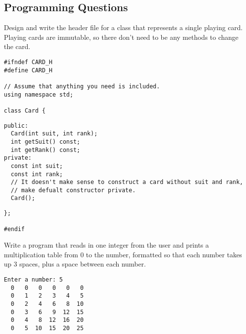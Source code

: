\documentclass[11pt,answers]{exam}
\begin{document}
\begin{questions}

\newpage
\section*{Programming Questions}

\question[20] Design and write the header file for a class that represents a single playing card. Playing cards are immutable, so there don't need to be any methods to change the card.
\begin{verbatim}
#ifndef CARD_H
#define CARD_H

// Assume that anything you need is included.
using namespace std;

class Card {
\end{verbatim}

\begin{solution}[4.5in]
\begin{verbatim}
public:
  Card(int suit, int rank);
  int getSuit() const;
  int getRank() const;
private:
  const int suit;
  const int rank;
  // It doesn't make sense to construct a card without suit and rank,
  // make defualt constructor private.
  Card();
\end{verbatim}
\end{solution}

\begin{verbatim}
};

#endif
\end{verbatim}

\newpage

\question[20] Write a program that reads in one integer from the user and prints a multiplication table from 0 to the number, formatted so that each number takes up 3 spaces, plus a space between each number. \newline
\begin{verbatim}
Enter a number: 5
  0   0   0   0   0   0 
  0   1   2   3   4   5 
  0   2   4   6   8  10 
  0   3   6   9  12  15 
  0   4   8  12  16  20 
  0   5  10  15  20  25
\end{verbatim}


\end{questions}
\end{document}
